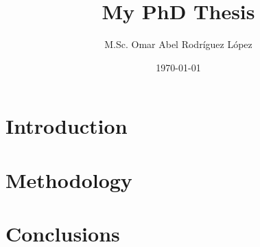 \documentclass[a4paper, 11pt]{memoir}
\title{My PhD Thesis}
\author{M.Sc. Omar Abel Rodríguez López}
\date{\today}
\begin{document}
\frontmatter



\newpage


\cleardoublepage

\tableofcontents
\newpage

%    



\mainmatter

\part{Introduction}






\part{Methodology}





%	


\part{Conclusions}




\appendix

%	

\backmatter


%    
%	




%
\end{document}
